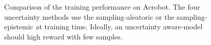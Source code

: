 \begin{figure}
    \caption{Comparison of the training performance on Acrobot. The four uncertainty methods use the sampling-aleatoric or the sampling-epistemic at training time. Ideally, an uncertainty aware-model should high reward with few samples.}
    \label{fig:strategy-training-performance-acrobot-main}
\end{figure}